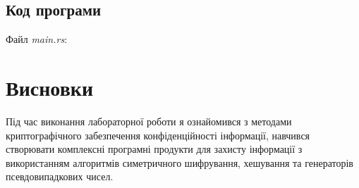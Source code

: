 \documentclass[oneside,14pt]{extarticle}
\begin{document}
\begin{normalsize}
	\subsection*{Код програми}
	Файл \textit{main.rs}:
	{\small	}
	
	\section*{Висновки}
	Під час виконання лабораторної роботи я ознайомився з методами криптографічного забезпечення
	конфіденційності інформації, навчився створювати комплексні програмні
	продукти для захисту інформації з використанням алгоритмів симетричного
	шифрування, хешування та генераторів псевдовипадкових чисел.
	    
\end{normalsize}
\end{document}
